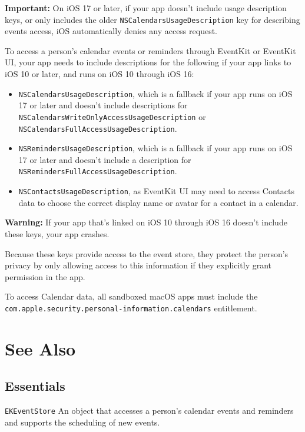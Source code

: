 \documentclass{article}
\begin{document}
\textbf{Important:}
On iOS 17 or later, if your app doesn't include usage description keys, or only includes the older \texttt{NSCalendarsUsageDescription} key for describing events access, iOS automatically denies any access request.

To access a person's calendar events or reminders through EventKit or EventKit UI, your app needs to include descriptions for the following if your app links to iOS 10 or later, and runs on iOS 10 through iOS 16:
\begin{itemize}
    \item \texttt{NSCalendarsUsageDescription}, which is a fallback if your app runs on iOS 17 or later and doesn't include descriptions for \texttt{NSCalendarsWriteOnlyAccessUsageDescription} or \texttt{NSCalendarsFullAccessUsageDescription}.
    \item \texttt{NSRemindersUsageDescription}, which is a fallback if your app runs on iOS 17 or later and doesn't include a description for \texttt{NSRemindersFullAccessUsageDescription}.
    \item \texttt{NSContactsUsageDescription}, as EventKit UI may need to access Contacts data to choose the correct display name or avatar for a contact in a calendar.
\end{itemize}

\textbf{Warning:} If your app that's linked on iOS 10 through iOS 16 doesn't include these keys, your app crashes.

Because these keys provide access to the event store, they protect the person's privacy by only allowing access to this information if they explicitly grant permission in the app.

To access Calendar data, all sandboxed macOS apps must include the \texttt{com.apple.security.personal-information.calendars} entitlement.

\section*{See Also}

\subsection*{Essentials}
\texttt{EKEventStore}
An object that accesses a person's calendar events and reminders and supports the scheduling of new events.

\newpage
\end{document}
